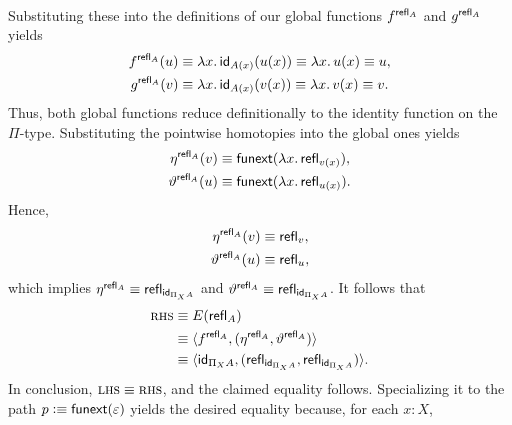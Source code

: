 \begin{solution}
\begin{enumerate}[a),font=\upshape]
\begin{enumerate}
\begin{align*}
            \end{align*}
            Substituting these into the definitions of our global functions $f^{\mathsf{refl}_A}$ and $g^{\mathsf{refl}_A}$ yields
            \begin{align*}
                f^{\mathsf{refl}_A}(u) 
                    &\equiv \lambda x.\, \mathsf{id}_{A(x)}(u(x)) \equiv \lambda x.\, u(x) \equiv u, \\
                g^{\mathsf{refl}_A}(v) 
                    &\equiv \lambda x.\, \mathsf{id}_{A(x)}(v(x)) \equiv \lambda x.\, v(x) \equiv v.
            \end{align*}
            Thus, both global functions reduce definitionally to the identity function on the $\Pi$-type. Substituting the pointwise homotopies into the global ones yields
            \begin{align*}
                \eta^{\mathsf{refl}_A}(v) 
                    &\equiv \mathsf{funext}(\lambda x.\, \mathsf{refl}_{v(x)}), \\
                \vartheta^{\mathsf{refl}_A}(u) 
                    &\equiv \mathsf{funext}(\lambda x.\, \mathsf{refl}_{u(x)}).
            \end{align*}
            Hence,
            \begin{align*}
                \eta^{\mathsf{refl}_A}(v) &\equiv \mathsf{refl}_v, \\
                \vartheta^{\mathsf{refl}_A}(u) &\equiv \mathsf{refl}_u,
            \end{align*}
            which implies $\eta^{\mathsf{refl}_A} \equiv \mathsf{refl}_{\mathsf{id}_{\Pi_XA}}$ and $\vartheta^{\mathsf{refl}_A} \equiv \mathsf{refl}_{\mathsf{id}_{\Pi_XA}}$. It follows that
            \begin{align*}
                \textsc{rhs}
                    &\equiv E(\mathsf{refl}_A)\\
                    &\equiv\langle f^{\mathsf{refl}_A},
                        (\eta^{\mathsf{refl}_A}, \vartheta^{\mathsf{refl}_A})\rangle\\
                    &\equiv\langle
                        \mathsf{id}_{\Pi_XA},
                            (
                                \mathsf{refl}_{\mathsf{id}_{\Pi_XA}}, 
                                \mathsf{refl}_{\mathsf{id}_{\Pi_XA}}
                            )
                    \rangle.
            \end{align*}
            In conclusion, $\textsc{lhs}\equiv\textsc{rhs}$, and the claimed equality follows. Specializing it to the path $p\mathrel{\vcentcolon}\equiv\mathsf{funext}(\varepsilon)$ yields the desired equality because, for each $x\colon X$,
            \begin{align*}

\end{align*}
\end{enumerate}
\end{enumerate}
\end{solution}
